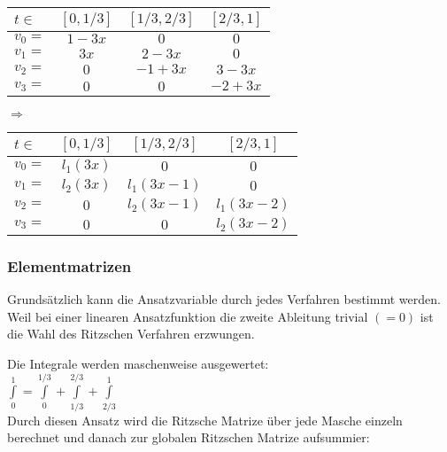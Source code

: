 \begin{minipage}{8cm}
	\begin{tabular}{lc|c|c}
		$t\in$ & $[0,1/3]$ & $[1/3,2/3]$ & $[2/3,1]$ \\
		\hline
		$v_0=$ & $1-3x$    & $0$         & $0$       \\
		$v_1=$ & $3x$      & $2-3x$      & $0$       \\
		$v_2=$ & $0$       & $-1+3x$     & $3-3x$    \\
		$v_3=$ & $0$       & $0$         & $-2+3x$   \\
	\end{tabular}
\end{minipage}
\hfill
\begin{minipage}{2cm}
	$\Longrightarrow$
\end{minipage}
\hfill
\begin{minipage}{8cm}
	\begin{tabular}{lc|c|c}
		$t\in$ & $[0,1/3]$ & $[1/3,2/3]$ & $[2/3,1]$   \\
		\hline
		$v_0=$ & $l_1(3x)$ & $0$         & $0$         \\
		$v_1=$ & $l_2(3x)$ & $l_1(3x-1)$ & $0$         \\
		$v_2=$ & $0$       & $l_2(3x-1)$ & $l_1(3x-2)$ \\
		$v_3=$ & $0$       & $0$         & $l_2(3x-2)$ \\
	\end{tabular}
\end{minipage}
\subsubsection{Elementmatrizen}
Grundsätzlich kann die Ansatzvariable durch jedes Verfahren bestimmt werden.
Weil bei einer linearen Ansatzfunktion die zweite Ableitung trivial $(=0)$ ist die Wahl des Ritzschen Verfahren erzwungen.

Die Integrale werden maschenweise ausgewertet:\\

$\int\limits_{0}^{1}{}=\int\limits_{0}^{1/3}{}+\int\limits_{1/3}^{2/3}{}+\int\limits_{2/3}^{1}{}$\\

Durch diesen Ansatz wird die Ritzsche Matrize über jede Masche einzeln berechnet und danach zur globalen Ritzschen Matrize aufsummier:\\

